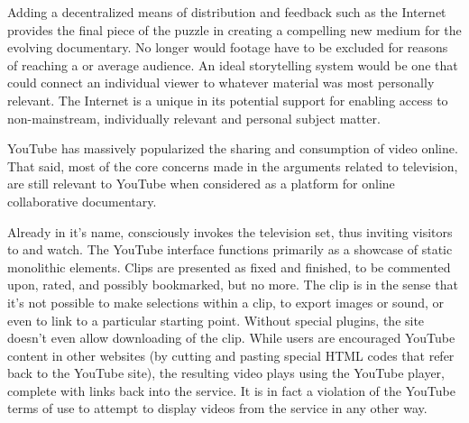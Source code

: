 {


Adding a decentralized means of distribution and feedback such as the
Internet provides the final piece of the puzzle in creating a
compelling new medium for the evolving documentary. No longer would
footage have to be excluded for reasons of reaching a
 or average audience. An ideal
storytelling system would be one that could connect an individual
viewer to whatever material was most personally relevant. The Internet
is a unique  in its
potential support for enabling access to non{}-mainstream, individually
relevant and personal subject matter.


YouTube has massively popularized the sharing and consumption of video
online. That said, most of the core concerns made in the arguments
related to television, are still relevant to YouTube when considered as
a platform for online collaborative documentary.

Already in it's name,  consciously invokes the
television set, thus inviting visitors to  and watch. The YouTube interface functions
primarily as a showcase of static monolithic elements. Clips are
presented as fixed and finished, to be commented upon, rated, and
possibly bookmarked, but no more. The clip is
 in the sense that
it's not possible to make selections within a clip, to
export images or sound, or even to link to a particular starting point.
Without special plugins, the site doesn't even allow
downloading of the clip. While users are encouraged  YouTube content in other
websites (by cutting and pasting special HTML codes that refer back to
the YouTube site), the resulting video plays using the YouTube player,
complete with  links back
into the service. It is in fact a violation of the YouTube terms of use
to attempt to display videos from the service in any other way.

}
